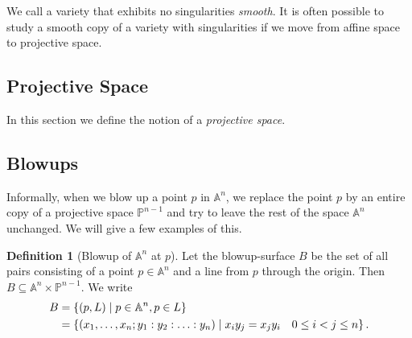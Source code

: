 \documentclass{article}
\theoremstyle{definition}
\newtheorem{definition}{Definition}
\newcommand{\A}{\mathbb{A}}
\renewcommand{\P}{\mathbb{P}}
\begin{document}
We call a variety that exhibits no singularities \emph{smooth}. It is often
possible to study a smooth copy of a variety with singularities if we move from
affine space to projective space.

\subsection{Projective Space}
\label{sub:projective_space}

In this section we define the notion of a \emph{projective space}. 

\subsection{Blowups}
\label{sub:blowups}

Informally, when we blow up a point $p$ in $\A^n$, we replace the point $p$ by
an entire copy of a projective space $\P^{n-1}$ and try to leave the rest of
the space $\A^n$ unchanged. We will give a few examples of this.

\begin{definition}[Blowup of $\A^n$ at $p$]
   Let the blowup-surface $B$ be the set of all pairs consisting of a point $p
   \in \A^n$ and a line from $p$ through the origin.  Then $B \subseteq
   \A^n\times\P^{n-1}$. We write
   \begin{align*}
       \notag
       B &= \left\{ (p, L) \mid p \in \A^n, p \in L \right\} \\
         &= \left\{ (x_1, \ldots, x_n ; y_1: y_2: \ldots :y_n) \mid x_iy_j =
           x_jy_i \quad 0 \leq i < j \leq n \right\}.
   \end{align*}
\end{definition}
\end{document}
